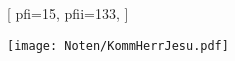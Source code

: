 [
    pfi={15}, 
    pfii={133},
]

\beginverse
\endverse
\texttt{[image: Noten/KommHerrJesu.pdf]}

\endsong
